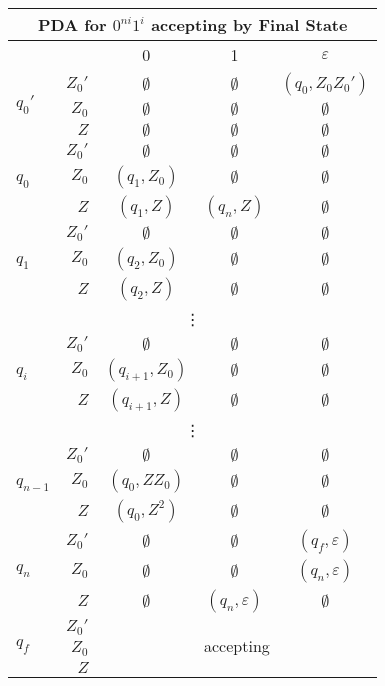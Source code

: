 \begin{center}\begin{tabular}{l r c c c}
    \multicolumn{5}{c}{PDA for \(0^{ni} 1^i\) accepting by Final State}\\\bottomrule
    & & 0 & 1 & \(\varepsilon \) \\\cmidrule{3-5}
    \multirow{3}{*}{\(q_0'\)} & \(Z_0'\) & \(\emptyset \) & \(\emptyset \) & \((q_0, Z_0 Z_0')\) \\
    & \(Z_0\) & \(\emptyset \) & \(\emptyset \) & \(\emptyset \) \\
    & \(Z\) & \(\emptyset \) & \(\emptyset \) & \(\emptyset \) \\\midrule
    \multirow{3}{*}{\(q_0\)}  & \(Z_0'\) & \(\emptyset \) & \(\emptyset \) & \(\emptyset \) \\
    & \(Z_0\) & \((q_1, Z_0)\) & \(\emptyset \) & \(\emptyset \) \\
    & \(Z\) & \((q_1, Z)\) & \((q_n, Z) \) & \(\emptyset \) \\\midrule
    \multirow{3}{*}{\(q_1\)} & \(Z_0'\) & \(\emptyset \) & \(\emptyset \) & \(\emptyset \) \\
    & \(Z_0\) & \((q_2, Z_0)\) & \(\emptyset \) & \(\emptyset \) \\
    & \(Z\) & \((q_2, Z) \)  & \(\emptyset \) & \(\emptyset \) \\\midrule
    \multicolumn{5}{c}{\vdots}\\\midrule
    \multirow{3}{*}{\(q_i\)} & \(Z_0'\) & \(\emptyset \) & \(\emptyset \) & \(\emptyset \) \\
     & \(Z_0\) & \((q_{i+1}, Z_0)\) & \(\emptyset \) &  \(\emptyset \) \\
    & \(Z\) & \((q_{i+1}, Z) \) & \(\emptyset \) & \(\emptyset \) \\\midrule
    \multicolumn{5}{c}{\vdots}\\\midrule
    \multirow{3}{*}{\(q_{n-1}\)}  & \(Z_0'\) & \(\emptyset \) & \(\emptyset \) & \(\emptyset \) \\
    & \(Z_0\) & \((q_0, ZZ_0)\) & \(\emptyset \) & \(\emptyset \) \\
    & \(Z\)  & \((q_0, Z^2) \) & \(\emptyset \) & \(\emptyset \) \\\midrule
    \multirow{3}{*}{\(q_n\)} & \(Z_0'\) & \(\emptyset \) & \(\emptyset \) & \((q_f, \varepsilon)\) \\
     & \(Z_0\) & \(\emptyset \) & \(\emptyset \) & \((q_n, \varepsilon)\) \\
    & \(Z\) & \(\emptyset \)  & \((q_n, \varepsilon ) \) & \(\emptyset \) \\\midrule
    \multirow{3}{*}{\(q_f\)} & \(Z_0'\) &\multicolumn{3}{c}{\multirow{3}{*}{accepting}} \\
    & \(Z_0\) \\
    & \(Z\)
\end{tabular}\end{center}

